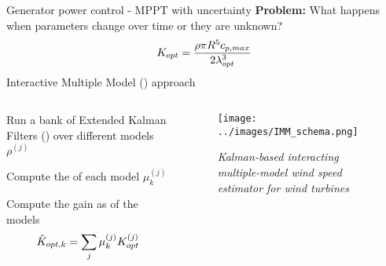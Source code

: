                                                

\begin{frame}{Generator power control - MPPT with uncertainty}
 \textcolor{yaleblue}{\textbf{Problem:}} What happens when parameters change over time or they are unknown?
  \begin{equation}
    K_{opt} =  \frac{\rho \pi R^5 c_{p,max}}{2\lambda_{opt}^3}
    \notag
  \end{equation}
  Interactive Multiple Model () approach

  \begin{columns}
    \begin{column}{0.5\columnwidth}
      \begin{myenumerate}
        \item Run a bank of Extended Kalman Filters () over different models $\rho^{(j)}$
        \item Compute the  of each model $\mu_k^{(j)}$
        \item Compute the gain as  of the models
        \begin{gather}
          \notag
          \hat{K}_{opt,k} = \sum_j \mu_k^{(j)} K_{opt}^{(j)} 
        \end{gather}
      \end{myenumerate}
    \end{column}

    \begin{column}{0.5\columnwidth}
      \begin{figure}[H]
        \centering
        \texttt{[image: ../images/IMM\_schema.png]}
        \caption{{\tiny \textit{Kalman-based interacting multiple-model wind speed estimator for wind turbines}}}
      \end{figure}
    \end{column}
  \end{columns}


\end{frame}
